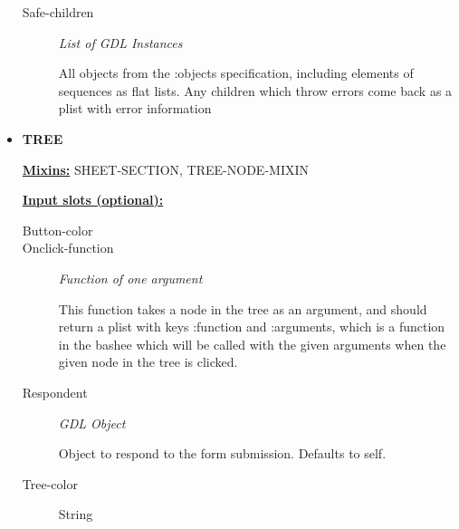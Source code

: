 \documentclass [11pt]{book}
\begin{document}
\begin{itemize}
\begin{description}
\item [Safe-children]
\emph{List of GDL Instances}

 All objects from the :objects specification, including elements of sequences
as flat lists. Any children which throw errors come back as a plist with error information




\end{description}







\item {}
\textbf{TREE}


\textbf{
\underline{Mixins:}} SHEET-SECTION, TREE-NODE-MIXIN





\begin{description}

\end{description}








\textbf{
\underline{Input slots (optional):}}

\begin{description}

\item [Button-color]





\item [Onclick-function]
\emph{Function of one argument}

 This function takes a node in the tree as an argument, and should return
a plist with keys :function and :arguments, which is a function in the bashee which will be called
with the given arguments when the given node in the tree is clicked.




\item [Respondent]
\emph{GDL Object}

 Object to respond to the form submission. Defaults to self.




\item [Tree-color]

String




\end{description}







\end{itemize}
\end{document}
